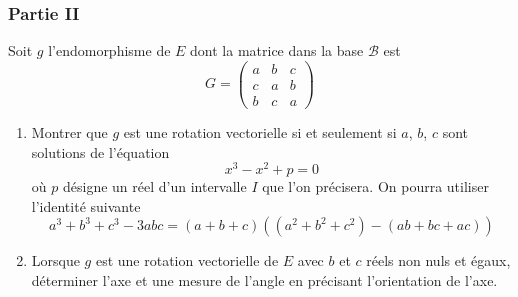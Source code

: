 \subsubsection*{Partie II}
Soit $g$ l'endomorphisme de $E$ dont la matrice dans la base $\mathcal{B}$ est
\[G=\begin{pmatrix}
  a & b & c \\
  c & a & b \\
  b & c & a
\end{pmatrix}\]
\begin{enumerate}
  \item Montrer que $g$ est une rotation vectorielle si et  seulement si $a$, $b$, $c$ sont solutions de l'{\'e}quation
  \[x^3-x^2+p=0\]
  o{\`u} $p$ d{\'e}signe un r{\'e}el d'un intervalle $I$ que l'on  pr{\'e}cisera.\newline
  On pourra utiliser l'identit{\'e} suivante
  \[a^3+b^3+c^3-3abc=(a+b+c)((a^2+b^2+c^2)-(ab+bc+ac))\]

  \item Lorsque $g$ est une rotation vectorielle de $E$ avec $b$ et $c$ r{\'e}els non nuls et {\'e}gaux, d{\'e}terminer l'axe et une mesure de l'angle en précisant l'orientation de l'axe.
\end{enumerate}

